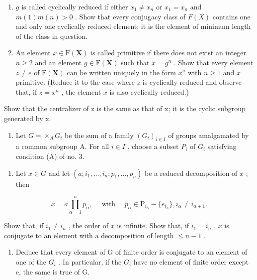 \begin{enumerate}
\def\labelenumi{(\alph{enumi})}
\item
  \(g\) is called cyclically reduced if either \(x_{1} \neq x_{n}\) or \(x_{1} = x_{n}\) and \(m(1)m(n) > 0\) . Show that every conjugacy class of \(F(X)\) contains one and only one cyclically reduced element; it is the element of minimum length of the class in question.
\item
  An element \(x \in \mathrm{F}(\mathbf{X})\) is called primitive if there does not exist an integer \(n \geqslant 2\) and an element \(g \in \mathrm{F}(\mathbf{X})\) such that \(x = g^n\) . Show that every element \(z \neq e\) of \(\mathrm{F}(\mathbf{X})\) can be written uniquely in the form \(x^n\) with \(n \geqslant 1\) and \(x\) primitive. (Reduce it to the case where \(z\) is cyclically reduced and observe that, if \(z = x^n\) , the element \(x\) is also cyclically reduced.)
\end{enumerate}

Show that the centralizer of z is the same as that of x; it is the cyclic subgroup generated by x.

\begin{enumerate}
\def\labelenumi{\arabic{enumi}.}
\setcounter{enumi}{26}
\tightlist
\item
  Let \(G = \times_{A} G_{i}\) be the sum of a family \((G_{i})_{i \in I}\) of groups amalgamated by a common subgroup A. For all \(i \in I\) , choose a subset \(P_{i}\) of \(G_{i}\) satisfying condition (A) of no. 3.
\end{enumerate}

\begin{enumerate}
\def\labelenumi{(\alph{enumi})}
\tightlist
\item
  Let \(x \in G\) and let \((a; i_1, \ldots, i_n; p_1, \ldots, p_n)\) be a reduced decomposition of \(x\) ; then
\end{enumerate}

\[
x = a \prod_ {\alpha = 1} ^ {n} p _ {\alpha}, \quad \text { with } \quad p _ {\alpha} \in \mathrm{P} _ {i _ {\alpha}} - \{e _ {i _ {\alpha}} \}, i _ {\alpha} \neq i _ {\alpha + 1}.
\]

Show that, if \(i_1 \neq i_n\) , the order of \(x\) is infinite. Show that, if \(i_1 = i_n\) , \(x\) is conjugate to an element with a decomposition of length \(\leqslant n - 1\) .

\begin{enumerate}
\def\labelenumi{(\alph{enumi})}
\setcounter{enumi}{1}
\tightlist
\item
  Deduce that every element of G of finite order is conjugate to an element of one of the \(G_{i}\) . In particular, if the \(G_{i}\) have no element of finite order except e, the same is true of G.
\end{enumerate}

